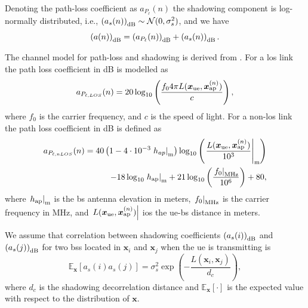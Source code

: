 \documentclass[conference,final]{IEEEtran}
\newcommand{\E}[2]{\mathbb{E}_{#1}\left[#2\right]}
\begin{document}
Denoting the path-loss coefficient as $a_{P_{\ell}}{(n)}$  the shadowing component is log-normally distributed, i.e., $\left(a_{s}{(n)}\right)_{\rm dB} \sim \mathcal{N}(0,\sigma_s^2)$, and we have
\begin{equation}
    \left(a{(n)}\right)_{\rm dB} = \left(a_{P_{\ell}}{(n)}\right)_{\rm dB} + \left(a_s{(n)}\right)_{\rm dB}.
\end{equation}

The channel model for path-loss and shadowing is derived from \cite{3gpp}. For a \ac{los} link the path loss coefficient in dB is modelled as
\begin{equation}\label{eq:los}
    a_{P_{\ell,LOS}}{(n)} = 20\log_{10}\left(\frac{f_0 4\pi L(\bm{x}_{\rm ue},\bm{x}_{\rm ap}^{(n)})}{c}\right),
\end{equation}
where $f_0$ is the carrier frequency, and $c$ is the speed of light. For a  non-\ac{los} link the path loss coefficient in dB is defined as
\begin{equation}
\begin{split}
    a_{P_{\ell, nLOS}}{(n)} = 40\left(1-4 \cdot 10^{-3} \left. h_{ap} \right|_{\rm m} \right) \log_{10}\left (\left.\frac{L(\bm{x}_{\rm ue},\bm{x}_{\rm ap}^{(n)})}{10^3}\right|_{\rm m}\right ) \\
    -18\log_{10}\left.h_{\rm ap}\right|_{\rm m}
    + 21\log_{10}\left(\frac{\left.f_0\right|_{\rm MHz}}{10^6}\right) + 80,
    \end{split}
\end{equation}
where $\left.h_{\rm ap}\right|_{\rm m}$ is the \ac{bs} antenna elevation in meters, $\left. f_0 \right|_{\rm MHz}$ is the carrier frequency in MHz, and $\left. L(\bm{x}_{\rm ue},\bm{x}_{\rm ap}^{(n)})\right|$ ios the \ac{ue}-\ac{bs} distance in meters.

We assume that correlation between shadowing coefficients $\left( a_{s}(i)\right)_{\rm dB}$ and $\left( a_{s}(j)\right)_{\rm dB}$ for two \acp{bs} located in $\bm{x}_i$ and $\bm{x}_j$ when the \ac{ue} is transmitting is
\begin{equation}\label{eq: coor mat}
    \E{\bm x}{a_{s}(i)a_{s}(j)} = \sigma_s^2\exp \left({-\frac{L(\bm{x}_i,\bm{x}_j)}{d_c}}\right),
\end{equation}
where $d_c$ is the shadowing decorrelation distance and $\E{\bm x}{\cdot}$ is the expected value with respect to the distribution of $\bm x$.
\end{document}
